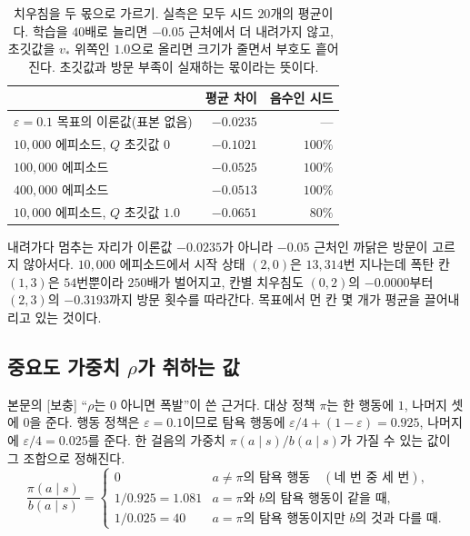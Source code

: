 \documentclass[11pt,a4paper]{article}
\begin{document}
\begin{table}[htbp]
\centering
\caption{치우침을 두 몫으로 가르기. 실측은 모두 시드 $20$개의 평균이다. 학습을 $40$배로 늘리면
$-0.05$ 근처에서 더 내려가지 않고, 초깃값을 $v_*$ 위쪽인 $1.0$으로 올리면 크기가 줄면서 부호도
흩어진다. 초깃값과 방문 부족이 실재하는 몫이라는 뜻이다.}
\label{tab:bias-split}
\small
\begin{tabular}{@{}lrr@{}}
\toprule
 & 평균 차이 & 음수인 시드 \\
\midrule
$\varepsilon=0.1$ 목표의 이론값(표본 없음) & $-0.0235$ & --- \\
\midrule
$10{,}000$ 에피소드, $Q$ 초깃값 $0$   & $-0.1021$ & $100\%$ \\
$100{,}000$ 에피소드                  & $-0.0525$ & $100\%$ \\
$400{,}000$ 에피소드                  & $-0.0513$ & $100\%$ \\
$10{,}000$ 에피소드, $Q$ 초깃값 $1.0$ & $-0.0651$ & $80\%$ \\
\bottomrule
\end{tabular}
\end{table}

내려가다 멈추는 자리가 이론값 $-0.0235$가 아니라 $-0.05$ 근처인 까닭은 방문이 고르지 않아서다.
$10{,}000$ 에피소드에서 시작 상태 $(2,0)$은 $13{,}314$번 지나는데 폭탄 칸 $(1,3)$은 $54$번뿐이라
$250$배가 벌어지고, 칸별 치우침도 $(0,2)$의 $-0.0000$부터 $(2,3)$의 $-0.3193$까지 방문 횟수를
따라간다. 목표에서 먼 칸 몇 개가 평균을 끌어내리고 있는 것이다.

\subsection{중요도 가중치 \texorpdfstring{$\rho$}{rho}가 취하는 값}
\label{app:rho}

본문의 [보충] ``$\rho$는 0 아니면 폭발''이 쓴 근거다. 대상 정책 $\pi$는 한 행동에 $1$, 나머지 셋에
$0$을 준다. 행동 정책은 $\varepsilon=0.1$이므로 탐욕 행동에 $\varepsilon/4 + (1-\varepsilon) =
0.925$, 나머지에 $\varepsilon/4 = 0.025$를 준다. 한 걸음의 가중치 $\pi(a\mid s)/b(a\mid s)$가 가질
수 있는 값이 그 조합으로 정해진다.
\begin{equation*}
  \frac{\pi(a\mid s)}{b(a\mid s)} =
  \begin{cases}
    0                        & a \neq \text{$\pi$의 탐욕 행동} \quad (\text{네 번 중 세 번}),\\[2pt]
    1/0.925 = 1.081          & a = \text{$\pi$와 $b$의 탐욕 행동이 같을 때},\\[2pt]
    1/0.025 = 40             & a = \text{$\pi$의 탐욕 행동이지만 $b$의 것과 다를 때}.
  \end{cases}
\end{equation*}
\end{document}
